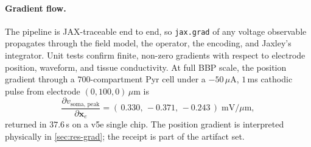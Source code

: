 \paragraph{Gradient flow.}
The pipeline is JAX-traceable end to end, so \texttt{jax.grad} of any
voltage observable propagates through the field model, the operator,
the encoding, and Jaxley's integrator. Unit tests confirm finite,
non-zero gradients with respect to electrode position, waveform, and
tissue conductivity. At full BBP scale, the position gradient through
a $700$-compartment Pyr cell under a $-50\,\mu$A, $1\,$ms cathodic
pulse from electrode $(0, 100, 0)\,\mu$m is
\[
  \frac{\partial v_{\mathrm{soma,\,peak}}}{\partial \mathbf{x}_e}
  = (\,0.330,\,-0.371,\,-0.243\,)\;\mathrm{mV}/\mu\mathrm{m},
\]
returned in $37.6\,$s on a v5e single chip. The position gradient is
interpreted physically in \cref{sec:res-grad}; the receipt is part of
the artifact set.

